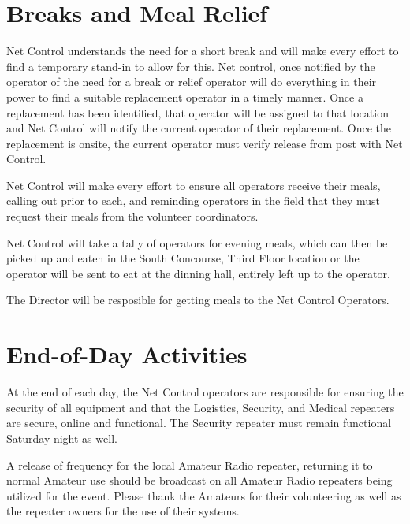 \documentclass[pdflatex,letterpaper,twoside,12pt]{book}
\begin{document}

\section{Breaks and Meal Relief}

Net Control understands the need for a short break and will make every effort to find a temporary stand-in to allow for this.  Net control, once notified by the operator of the need for a break or relief operator will do everything in their power to find a suitable replacement operator in a timely manner.  Once a replacement has been identified, that operator will be assigned to that location and Net Control will notify the current operator of their replacement.  Once the replacement is onsite, the current operator must verify release from post with Net Control.

Net Control will make every effort to ensure all operators receive their meals, calling out prior to each, and reminding operators in the field that they must request their meals from the volunteer coordinators.

Net Control will take a tally of operators for evening meals, which can then be picked up and eaten in the South Concourse, Third Floor location or the operator will be sent to eat at the dinning hall, entirely left up to the operator.

The Director will be resposible for getting meals to the Net Control Operators.


\section{End-of-Day Activities}

At the end of each day, the Net Control operators are responsible for ensuring the security of all equipment and that the Logistics, Security, and Medical repeaters are secure, online and functional. The Security repeater must remain functional Saturday night as well.

A release of frequency for the local Amateur Radio repeater, returning it to normal Amateur use should be broadcast on all Amateur Radio repeaters being utilized for the event. Please thank the Amateurs for their volunteering as well as the repeater owners for the use of their systems.
\end{document}
